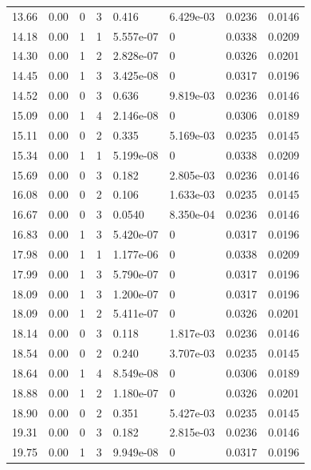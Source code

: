 \documentclass[preview]{standalone}
\begin{document}
{{{\begin{tabular}{L{1.2cm}C{1.2cm} C{0.3cm}C{0.5cm} C{1.4cm}C{1.4cm} C{1.4cm}C{1.4cm}}
  13.66  &  0.00  & 0     &  3 &  0.416  & 6.429e-03  & 0.0236 &  0.0146   \\ 
  14.18  &  0.00  & 1     &  1 &  5.557e-07  & 0  & 0.0338 &  0.0209   \\ 
  14.30  &  0.00  & 1     &  2 &  2.828e-07  & 0  & 0.0326 &  0.0201   \\ 
  14.45  &  0.00  & 1     &  3 &  3.425e-08  & 0  & 0.0317 &  0.0196   \\ 
  14.52  &  0.00  & 0     &  3 &  0.636  & 9.819e-03  & 0.0236 &  0.0146   \\ 
  15.09  &  0.00  & 1     &  4 &  2.146e-08  & 0  & 0.0306 &  0.0189   \\ 
  15.11  &  0.00  & 0     &  2 &  0.335  & 5.169e-03  & 0.0235 &  0.0145   \\ 
  15.34  &  0.00  & 1     &  1 &  5.199e-08  & 0  & 0.0338 &  0.0209   \\ 
  15.69  &  0.00  & 0     &  3 &  0.182  & 2.805e-03  & 0.0236 &  0.0146   \\ 
  16.08  &  0.00  & 0     &  2 &  0.106  & 1.633e-03  & 0.0235 &  0.0145   \\ 
  16.67  &  0.00  & 0     &  3 &  0.0540  & 8.350e-04  & 0.0236 &  0.0146   \\ 
  16.83  &  0.00  & 1     &  3 &  5.420e-07  & 0  & 0.0317 &  0.0196   \\ 
  17.98  &  0.00  & 1     &  1 &  1.177e-06  & 0  & 0.0338 &  0.0209   \\ 
  17.99  &  0.00  & 1     &  3 &  5.790e-07  & 0  & 0.0317 &  0.0196   \\ 
  18.09  &  0.00  & 1     &  3 &  1.200e-07  & 0  & 0.0317 &  0.0196   \\ 
  18.09  &  0.00  & 1     &  2 &  5.411e-07  & 0  & 0.0326 &  0.0201   \\ 
  18.14  &  0.00  & 0     &  3 &  0.118  & 1.817e-03  & 0.0236 &  0.0146   \\ 
  18.54  &  0.00  & 0     &  2 &  0.240  & 3.707e-03  & 0.0235 &  0.0145   \\ 
  18.64  &  0.00  & 1     &  4 &  8.549e-08  & 0  & 0.0306 &  0.0189   \\ 
  18.88  &  0.00  & 1     &  2 &  1.180e-07  & 0  & 0.0326 &  0.0201   \\ 
  18.90  &  0.00  & 0     &  2 &  0.351  & 5.427e-03  & 0.0235 &  0.0145   \\ 
  19.31  &  0.00  & 0     &  3 &  0.182  & 2.815e-03  & 0.0236 &  0.0146   \\ 
  19.75  &  0.00  & 1     &  3 &  9.949e-08  & 0  & 0.0317 &  0.0196   \\ 

\end{tabular}}}}
\end{document}
